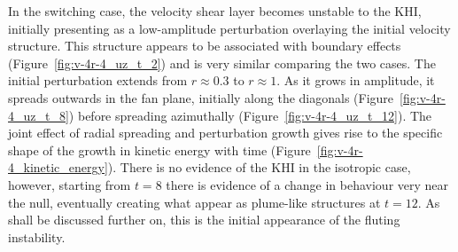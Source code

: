 
In the switching case, the velocity shear layer becomes unstable to the KHI, initially presenting as a low-amplitude perturbation overlaying the initial velocity structure. This structure appears to be associated with boundary effects (Figure~\ref{fig:v-4r-4_uz_t_2}) and is very similar comparing the two cases. The initial perturbation extends from $r\approx0.3$ to $r\approx1$. As it grows in amplitude, it spreads outwards in the fan plane, initially along the diagonals (Figure~\ref{fig:v-4r-4_uz_t_8}) before spreading azimuthally (Figure~\ref{fig:v-4r-4_uz_t_12}). The joint effect of radial spreading and perturbation growth gives rise to the specific shape of the growth in kinetic energy with time (Figure~\ref{fig:v-4r-4_kinetic_energy}). There is no evidence of the KHI in the isotropic case, however, starting from $t=8$ there is evidence of a change in behaviour very near the null, eventually creating what appear as plume-like structures at $t=12$. As shall be discussed further on, this is the initial appearance of the fluting instability.

